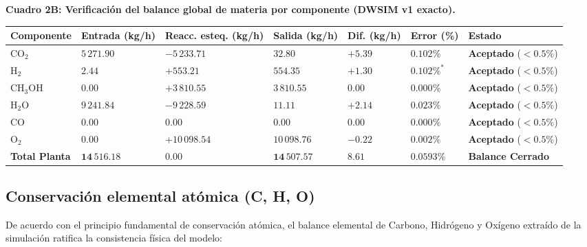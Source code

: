 \documentclass[11pt,letterpaper]{article}
\begin{document}
\vspace{0.25cm}
\begin{center}
\small
\setlength{\tabcolsep}{3.5pt}
\renewcommand{\arraystretch}{1.06}
\textbf{Cuadro 2B: Verificación del balance global de materia por componente (DWSIM v1 exacto).}\\[3pt]
\begin{tabularx}{\textwidth}{>{\raggedright\arraybackslash}p{2.1cm} >{\centering\arraybackslash}p{2.0cm} >{\centering\arraybackslash}p{2.4cm} >{\centering\arraybackslash}p{2.0cm} >{\centering\arraybackslash}p{1.6cm} >{\centering\arraybackslash}p{1.5cm} >{\centering\arraybackslash}X}
\toprule
\textbf{Componente} & \textbf{Entrada (kg/h)} & \textbf{Reacc. esteq. (kg/h)} & \textbf{Salida (kg/h)} & \textbf{Dif. (kg/h)} & \textbf{Error (\%)} & \textbf{Estado} \\
\midrule
$\text{CO}_2$ & $5\,271.90$ & $-5\,233.71$ & $32.80$ & $+5.39$ & $0.102\%$ & \textbf{Aceptado} ($<0.5\%$) \\
$\text{H}_2$ & $2.44$ & $+553.21$ & $554.35$ & $+1.30$ & $0.102\%^*$ & \textbf{Aceptado} ($<0.5\%$) \\
$\text{CH}_3\text{OH}$ & $0.00$ & $+3\,810.55$ & $3\,810.55$ & $0.00$ & $0.000\%$ & \textbf{Aceptado} ($<0.5\%$) \\
$\text{H}_2\text{O}$ & $9\,241.84$ & $-9\,228.59$ & $11.11$ & $+2.14$ & $0.023\%$ & \textbf{Aceptado} ($<0.5\%$) \\
$\text{CO}$ & $0.00$ & $0.00$ & $0.00$ & $0.00$ & $0.000\%$ & \textbf{Aceptado} ($<0.5\%$) \\
$\text{O}_2$ & $0.00$ & $+10\,098.54$ & $10\,098.76$ & $-0.22$ & $0.002\%$ & \textbf{Aceptado} ($<0.5\%$) \\
\midrule
\textbf{Total Planta} & $\mathbf{14\,516.18}$ & $\mathbf{0.00}$ & $\mathbf{14\,507.57}$ & $\mathbf{8.61}$ & $\mathbf{0.0593\%}$ & \textbf{Balance Cerrado} \\
\bottomrule
\end{tabularx}
\end{center}

\vspace{0.25cm}
\subsection{Conservación elemental atómica (C, H, O)}

De acuerdo con el principio fundamental de conservación atómica, el balance elemental de Carbono, Hidrógeno y Oxígeno extraído de la simulación ratifica la consistencia física del modelo:
\end{document}
